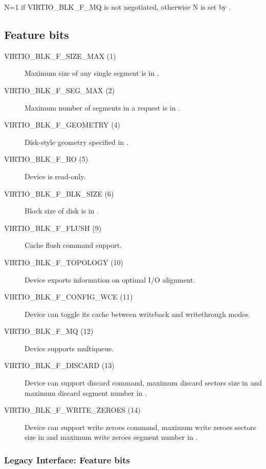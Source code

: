 N=1 if VIRTIO_BLK_F_MQ is not negotiated, otherwise N is set by
 .

\subsection{Feature bits}\label{sec:Device Types / Block Device / Feature bits}

\begin{description}
\item[VIRTIO_BLK_F_SIZE_MAX (1)] Maximum size of any single segment is
    in .

\item[VIRTIO_BLK_F_SEG_MAX (2)] Maximum number of segments in a
    request is in .

\item[VIRTIO_BLK_F_GEOMETRY (4)] Disk-style geometry specified in
    .

\item[VIRTIO_BLK_F_RO (5)] Device is read-only.

\item[VIRTIO_BLK_F_BLK_SIZE (6)] Block size of disk is in .

\item[VIRTIO_BLK_F_FLUSH (9)] Cache flush command support.

\item[VIRTIO_BLK_F_TOPOLOGY (10)] Device exports information on optimal I/O
    alignment.

\item[VIRTIO_BLK_F_CONFIG_WCE (11)] Device can toggle its cache between writeback
    and writethrough modes.

\item[VIRTIO_BLK_F_MQ (12)] Device supports multiqueue.

\item[VIRTIO_BLK_F_DISCARD (13)] Device can support discard command, maximum
    discard sectors size in  and maximum discard
    segment number in .

\item[VIRTIO_BLK_F_WRITE_ZEROES (14)] Device can support write zeroes command,
     maximum write zeroes sectors size in  and
     maximum write zeroes segment number in .
\end{description}

\subsubsection{Legacy Interface: Feature bits}\label{sec:Device Types / Block Device / Feature bits / Legacy Interface: Feature bits}


